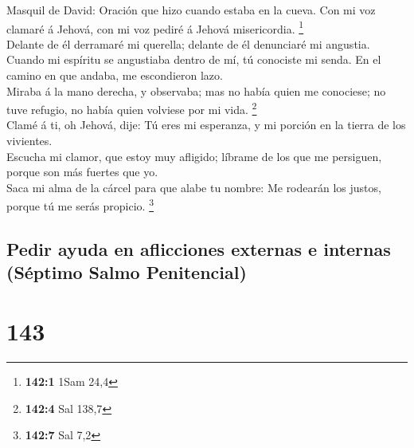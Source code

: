  Masquil de David: Oración que hizo cuando estaba en la
cueva. Con mi voz clamaré á Jehová, con mi voz pediré á Jehová
misericordia. \footnote{\textbf{142:1} 1Sam 24,4}\\
 Delante de él derramaré mi querella; delante de él
denunciaré mi angustia.\\
 Cuando mi espíritu se angustiaba dentro de mí, tú conociste
mi senda. En el camino en que andaba, me escondieron lazo.\\
 Miraba á la mano derecha, y observaba; mas no había quien
me conociese; no tuve refugio, no había quien volviese por mi vida.
\footnote{\textbf{142:4} Sal 138,7}\\
 Clamé á ti, oh Jehová, dije: Tú eres mi esperanza, y mi
porción en la tierra de los vivientes.\\
 Escucha mi clamor, que estoy muy afligido; líbrame de los
que me persiguen, porque son más fuertes que yo.\\
 Saca mi alma de la cárcel para que alabe tu nombre: Me
rodearán los justos, porque tú me serás propicio. \footnote{\textbf{142:7}
  Sal 7,2}

\hypertarget{pedir-ayuda-en-aflicciones-externas-e-internas-suxe9ptimo-salmo-penitencial}{%
\subsection{Pedir ayuda en aflicciones externas e internas (Séptimo
Salmo
Penitencial)}\label{pedir-ayuda-en-aflicciones-externas-e-internas-suxe9ptimo-salmo-penitencial}}

\hypertarget{section-142}{%
\section{143}\label{section-142}}

